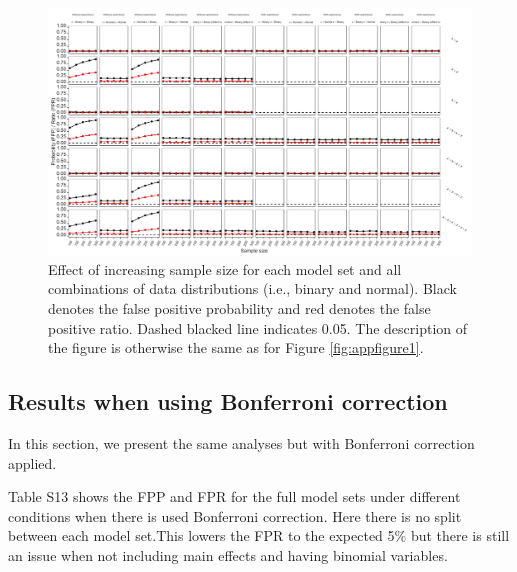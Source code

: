 \begin{landscape}
\begin{figure}[hbt!]
\includegraphics[scale=0.75]{R/Analysis/Result/Figures/Figure1DSI.jpeg}
\centering
\caption{Effect of increasing sample size for each model set and all combinations of data distributions (i.e., binary and normal). Black denotes the false positive probability and red denotes the false positive ratio. Dashed blacked line indicates 0.05. The description of the figure is otherwise the same as for Figure \ref{fig:appfigure1}.}
\label{fig:appfigure6}
\end{figure}
\end{landscape}

\clearpage
\subsection{Results when using Bonferroni correction}

In this section, we present the same analyses but with Bonferroni correction applied. 

Table S13 shows the FPP and FPR for the full model sets under different conditions when there is used Bonferroni correction. Here there is no split between each model set.This lowers the FPR to the expected 5\% but there is still an issue when not including main effects and having binomial variables. 




